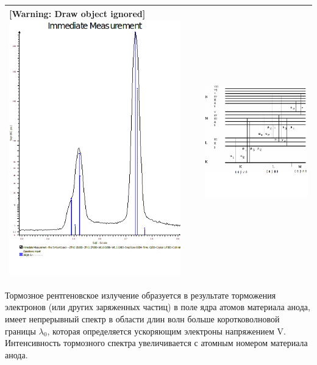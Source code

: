 \documentclass[a4paper,14pt, openany, twoside, draft]{extbook} %
\begin{document}
\begin{flushleft}
\tablefirsthead{}
\tablehead{}
\tabletail{}
\tablelasttail{}
\begin{supertabular}{|m{8.0130005cm}|m{8.485001cm}|}
\hline
{ [Warning: Draw object ignored] \includegraphics[width=7.44cm,height=11.128cm]{a12-img002.png} } &
{  \includegraphics[width=8.285cm,height=9.442cm]{a12-img003.png} }\\\hline
\end{supertabular}
\end{flushleft}
Тормозное рентгеновское излучение образуется в результате торможения электронов (или других заряженных частиц) в поле ядра атомов материала анода, имеет непрерывный спектр в области длин волн больше коротковолновой границы  $\lambda _0$, которая определяется ускоряющим электроны напряжением V. Интенсивность тормозного спектра увеличивается с атомным номером материала анода.
\end{document}
